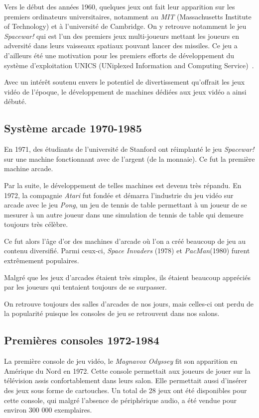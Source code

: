 \documentclass[12pt,oneside,letterpaper,francais]{book}
\newcommand{\si}{{\textit{Space Invaders }}}
\begin{document}
Vers le début des années 1960, quelques jeux ont fait leur apparition
sur les premiers ordinateurs universitaires, notamment au \textit{MIT}
(Massachusetts Institute of Technology) et à l'université de
Cambridge. On y retrouve notamment le jeu \textit{Spacewar!} qui est
l'un des premiers jeux multi-joueurs mettant les joueurs en adversité
dans leurs vaisseaux spatiaux pouvant lancer des missiles. Ce jeu a
d'ailleurs été une motivation pour les premiers efforts de
développement du système d'exploitation UNICS (UNiplexed Information
and Computing Service)~\cite{SPACEWAR-UNICS}.

Avec un intérêt soutenu envers le potentiel de divertissement
qu'offrait les jeux vidéo de l'époque, le développement de machines
dédiées aux jeux vidéo a ainsi débuté.

\subsection{Système arcade 1970-1985}
En 1971, des étudiants de l'université de Stanford ont réimplanté le
jeu \textit{Spacewar!} sur une machine fonctionnant avec de l'argent
(de la monnaie). Ce fut la première machine arcade.

Par la suite, le développement de telles machines est devenu très
répandu. En 1972, la compagnie \textit{Atari} fut fondée et démarra
l'industrie du jeu vidéo sur arcade avec le jeu \textit{Pong}, un jeu
de tennis de table permettant à un joueur de se mesurer à un autre
joueur dans une simulation de tennis de table qui demeure toujours
très célèbre.

Ce fut alors l'âge d'or des machines d'arcade où l'on a créé beaucoup
de jeu au contenu diversifié. Parmi ceux-ci, \si(1978) et
\textit{PacMan}(1980) furent extrêmement populaires.

Malgré que les jeux d'arcades étaient très simples, ils étaient
beaucoup appréciés par les joueurs qui tentaient toujours de se
surpasser.

On retrouve toujours des salles d'arcades de nos jours, mais celles-ci
ont perdu de la popularité puisque les consoles de jeu se
retrouvent dans nos salons.

\subsection{Premières consoles 1972-1984}

La première console de jeu vidéo, le \textit{Magnavox Odyssey} fit son
apparition en Amérique du Nord en 1972. Cette console permettait aux
joueurs de jouer sur la télévision assis confortablement dans leurs
salon. Elle permettait aussi d'insérer des jeux sous forme de
cartouches. Un total de 28 jeux ont été disponibles pour cette
console, qui malgré l'absence de périphérique audio, a été vendue pour
environ 300 000 exemplaires.
\end{document}

